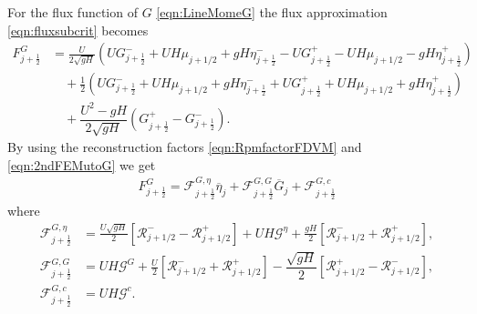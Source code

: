 For the flux function of $G$ \eqref{eqn:LineMomeG} the flux approximation \eqref{eqn:fluxsubcrit} becomes
\begin{align*}
F^G_{j+\frac{1}{2}} &= \frac{U}{2 \sqrt{gH}} \left(UG^-_{j+\frac{1}{2}} + UH \mu_{j+1/2} + gH\eta^-_{j+\frac{1}{2}} - UG^+_{j+\frac{1}{2}} - UH \mu_{j+1/2} - gH\eta^+_{j+\frac{1}{2}}  \right)   \nonumber \\ & \quad + \frac{1}{2}\left(UG^-_{j+\frac{1}{2}} + UH \mu_{j+1/2} + gH\eta^-_{j+\frac{1}{2}} + UG^+_{j+\frac{1}{2}} + UH \mu_{j+1/2} + gH\eta^+_{j+\frac{1}{2}}\right) \nonumber \\ & \quad+ \dfrac{U^2 - gH}{2\sqrt{g H}} \left ( G^+_{j+\frac{1}{2}} - G^-_{j+\frac{1}{2}} \right ).
\end{align*}
By using the reconstruction factors \eqref{eqn:RpmfactorFDVM} and \eqref{eqn:2ndFEMutoG} we get
	\begin{align*}
	F^G_{j+\frac{1}{2}} = \mathcal{F}^{G, \eta}_{j+\frac{1}{2}} \overline{\eta}_{j} + \mathcal{F}^{G, G}_{j+\frac{1}{2}} \overline{G}_{j} + \mathcal{F}^{G, c}_{j+\frac{1}{2}}
	\end{align*}
	where
	\begin{align*}
		\mathcal{F}^{G, \eta}_{j+\frac{1}{2}} &=  \frac{U\sqrt{gH}}{2} \left[ \mathcal{R}^-_{j+1/2} - \mathcal{R}^+_{j+1/2}  \right] + UH\mathcal{G}^{\eta} + \frac{gH}{2} \left[ \mathcal{R}^-_{j+1/2} +\mathcal{R}^+_{j+1/2} \right], \\
	\mathcal{F}^{G, G}_{j+\frac{1}{2}} &=  UH\mathcal{G}^{G} + \frac{U}{2} \left[ \mathcal{R}^-_{j+1/2} +\mathcal{R}^+_{j+1/2} \right] - \dfrac{\sqrt{g H}}{2} \left [\mathcal{R}^+_{j+1/2} - \mathcal{R}^-_{j+1/2} \right ],  \\
	\mathcal{F}^{G, c}_{j+\frac{1}{2}} &=  UH\mathcal{G}^c.
	\end{align*}


